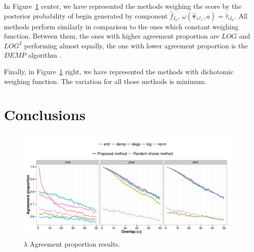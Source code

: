 \documentclass[10pt, a4paper]{article}
\newcommand{\m}[1]{\boldsymbol{#1}}
\begin{document}
In Figure~\ref{fig:mub} center, we have represented the methods weighing the score by the posterior probability of begin generated by component $\hat{f}_{I_a}$, $\omega(\hat{\m \tau}_{i \mathcal{I}_s}, a) =  \hat{\tau}_{iI_a}$. All methods perform similarly in comparison to the ones which constant weighing function. Between them, the ones with higher agreement proportion are $LOG$ and $LOG^2$ performing almost equally, the one with lower agreement proportion is the $DEMP$ algorithm \citep{hennig2010methods}.

Finally, in Figure~\ref{fig:mub} right, we have represented the methods with dichotomic weighing function. The variation for all those methods is minimum.

\section{Conclusions}


\begin{figure}[!h]
\centering
\includegraphics[width=\textwidth]{linesagreement.pdf}
\caption{$\lambda$ Agreement proportion results.}
\label{fig:mub}
\end{figure}
\end{document}
